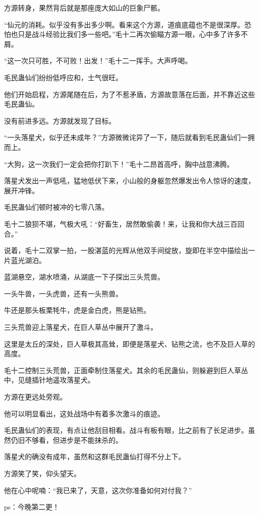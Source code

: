 \begin{this_body}
方源转身，果然背后就是那座庞大如山的巨象尸骸。

“仙元的消耗。似乎没有多出多少啊。看来这个方源，道痕底蕴也不是很深厚。恐怕也只是战斗经验比我们多一些吧。”毛十二再次偷瞄方源一眼，心中多了许多不屑。

“这一次只可胜，不可败！出发！”毛十二一挥手。大声呼喝。

毛民蛊仙们纷纷低呼应和，士气很旺。

他们开始启程，方源尾随在后，为了不惹矛盾，方源故意落在后面，并不靠近这些毛民蛊仙。

没有前进多远。方源就发现了目标。

“一头落星犬，似乎还未成年？”方源微微诧异了一下，随后就看到毛民蛊仙们一拥而上。

“大狗，这一次我们一定会把你打趴下！”毛十二昂首高呼，胸中战意沸腾。

落星犬发出一声低吼，猛地低伏下来，小山般的身躯忽然爆发出令人惊讶的速度，展开冲锋。

毛民蛊仙们顿时被冲的七零八落。

毛十二狼狈不堪，气极大吼：“好畜生，居然敢偷袭！来，让我和你大战三百回合。”

说着，毛十二双掌一拍，一股湛蓝的光辉从他双手间绽放，旋即在半空中描绘出一片蓝光湖泊。

蓝湖悬空，湖水喷涌，从湖底一下子探出三头荒兽。

一头牛兽，一头虎兽，还有一头熊兽。

牛还是那头板栗牦牛，虎是金白虎，熊是钻熊。

三头荒兽迎上落星犬，在巨人草丛中展开了激斗。

这里是太丘的深处，巨人草极其高耸，即便是落星犬、钻熊之流，也不及巨人草的高度。

毛十二控制三头荒兽，正面牵制住落星犬。其余的毛民蛊仙，则躲避到巨人草丛中，见缝插针地遥攻落星犬。

方源在更远处旁观。

他可以明显看出，这处战场中有着多次激斗的痕迹。

毛民蛊仙们的表现，有点让他刮目相看。战斗有板有眼，比之前有了长足进步。虽然仍旧不够看，但进步是不能抹杀的。

落星犬的确没有成年，虽然和这群毛民蛊仙打得不分上下。

方源笑了笑，仰头望天。

他在心中呢喃：“我已来了，天意，这次你准备如何对付我？”

ps：今晚第二更！

\end{this_body}

